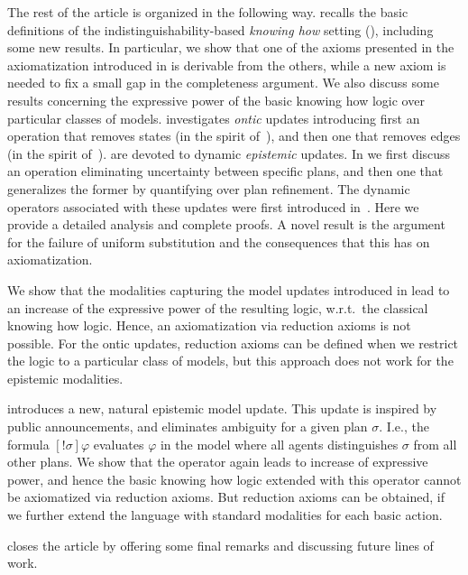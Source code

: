 \begin{mrevised}
The rest of the article is organized in the following way.  recalls the basic definitions of the indistinguishability-based \emph{knowing how} setting (\cite{AFSVQ21,AFSVQ23report}), including some new results. In particular, we show that one of the axioms presented in the axiomatization introduced in \cite{AFSVQ21,AFSVQ23report} is derivable from the others, while a new axiom is needed to fix a small gap in the completeness argument. We also discuss some results concerning the expressive power of the basic knowing how logic over particular classes of models.  investigates \emph{ontic} updates introducing first an operation that removes states (in the spirit of~\cite{Plaza89:lopc}), and then one that removes edges (in the spirit of~\cite{KooiR11}).  are devoted to dynamic \emph{epistemic} updates. 
In  we first discuss an operation eliminating uncertainty between specific plans, and then one that generalizes the former by quantifying over plan refinement. 
The dynamic operators associated with these updates were first introduced in~\cite{AFSV22}. Here we provide a detailed analysis and complete proofs.  A novel result is the argument for the failure of uniform substitution and the consequences that this has on axiomatization.    


We show that the modalities capturing the model updates introduced in  lead to an increase of the expressive power of the resulting logic, w.r.t.\ the classical knowing how logic. Hence, an axiomatization via reduction axioms is not possible. For the ontic updates, reduction axioms can be defined when we restrict the logic to a particular class of models, but this approach does not work for the epistemic modalities. 

 introduces a new, natural epistemic model update.  This update is inspired by public announcements, and eliminates ambiguity for a given plan $\sigma$. I.e., the formula $[!\sigma]\varphi$ evaluates $\varphi$ in the model where all agents distinguishes $\sigma$ from all other plans. We show that the operator again leads 
to increase of expressive power, and hence the basic knowing how logic extended with this operator cannot be axiomatized via reduction axioms.  But reduction axioms can be obtained, if we further extend the language with standard modalities for each basic action. 
 
 closes the article by offering some final remarks and discussing future lines of work.
\end{mrevised}
